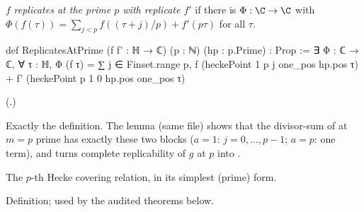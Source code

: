 \begin{definition}\label{ch16:def:repprime}
$f$ \emph{replicates at the prime $p$ with replicate $f'$} if there is $\Phi:\C\to\C$ with
$\Phi(f(\tau))=\sum_{j<p}f((\tau+j)/p)+f'(p\tau)$ for all $\tau$.
\end{definition}
\begin{leancode}
def ReplicatesAtPrime (f f' : ℍ → ℂ) (p : ℕ) (hp : p.Prime) : Prop :=
  ∃ Φ : ℂ → ℂ, ∀ τ : ℍ, Φ (f τ) = ∑ j ∈ Finset.range p, f (heckePoint 1 p j one_pos hp.pos τ) +
    f' (heckePoint p 1 0 hp.pos one_pos τ)
\end{leancode}
(.)
\begin{dictionary}
Exactly the definition.  The lemma  (same file) shows that the divisor-sum of
 at $m=p$ prime has exactly these two blocks ($a=1$: $j=0,\dots,p-1$; $a=p$: one term),
and  turns complete replicability of $g$ at $p$ into
.
\end{dictionary}
\begin{physics}
The $p$-th Hecke covering relation, in its simplest (prime) form.
\end{physics}
\begin{status}
Definition; used by the audited theorems below.
\end{status}


